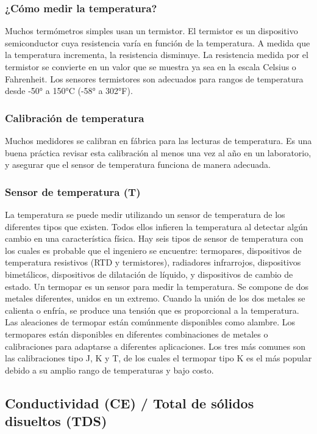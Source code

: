 \subsubsection{¿Cómo medir la temperatura?}
Muchos termómetros simples usan un termistor.  
El termistor es un dispositivo semiconductor cuya resistencia varía en función de la temperatura.  
A medida que la temperatura incrementa, la resistencia disminuye.  
La resistencia medida por el termistor se convierte en un valor que se muestra ya sea en la escala Celsius o Fahrenheit.  
Los sensores termistores son adecuados para rangos de temperatura desde -50° a 150°C (-58° a 302°F).

\subsubsection{Calibración de temperatura}
Muchos medidores se calibran en fábrica para las lecturas de temperatura. 
Es una buena práctica revisar esta calibración al menos una vez al año en un laboratorio, y asegurar que el sensor de temperatura funciona de manera adecuada.

\subsubsection{Sensor de temperatura (T)}
La temperatura se puede medir utilizando un sensor de temperatura de los diferentes tipos que existen. 
Todos ellos infieren la temperatura al detectar algún cambio en una característica física. 
Hay seis tipos de sensor de temperatura con los cuales es probable que el ingeniero se encuentre: termopares, dispositivos de temperatura resistivos (RTD y termistores), radiadores infrarrojos, dispositivos bimetálicos, dispositivos de dilatación de l\'iquido, y dispositivos de cambio de estado.
Un termopar es un sensor para medir la temperatura. 
Se compone de dos metales diferentes, unidos en un extremo. Cuando la unión de los dos metales se calienta o enfría, se produce una tensión que es proporcional a la temperatura. 
Las aleaciones de termopar están comúnmente disponibles como alambre.
Los termopares están disponibles en diferentes combinaciones de metales o calibraciones para adaptarse a diferentes aplicaciones. 
Los tres más comunes son las calibraciones tipo J, K y T, de los cuales el termopar tipo K es el más popular debido a su amplio rango de temperaturas y bajo costo.

\subsection{Conductividad (CE) / Total de sólidos disueltos (TDS)}

